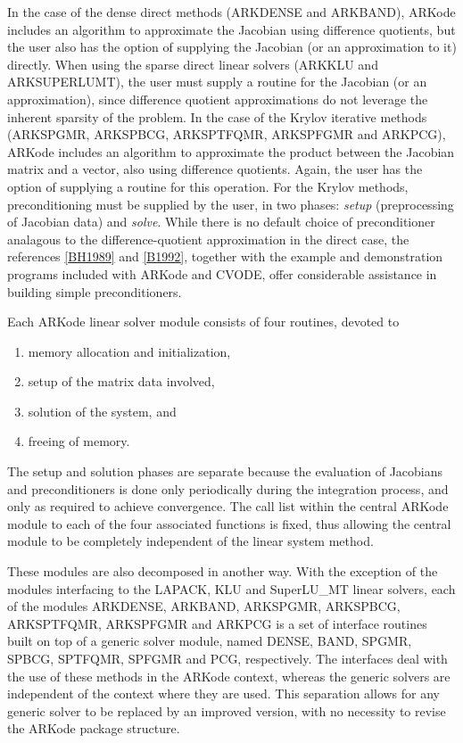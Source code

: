 \documentclass[letterpaper,10pt,english]{sphinxmanual}
\begin{document}
In the case of the dense direct methods (ARKDENSE and ARKBAND), ARKode
includes an algorithm to approximate the Jacobian using difference
quotients, but the user also has the option of supplying the Jacobian
(or an approximation to it) directly.  When using the sparse direct
linear solvers (ARKKLU and ARKSUPERLUMT), the user must supply a
routine for the Jacobian (or an approximation), since difference
quotient approximations do not leverage the inherent sparsity of the
problem.  In the case of the Krylov iterative methods (ARKSPGMR,
ARKSPBCG, ARKSPTFQMR, ARKSPFGMR and ARKPCG), ARKode includes an
algorithm to approximate the product between the Jacobian matrix and a
vector, also using difference quotients.  Again, the user has the
option of supplying a routine for this operation.  For the Krylov
methods, preconditioning must be supplied by the user, in two phases:
\emph{setup} (preprocessing of Jacobian data) and \emph{solve}.  While there is
no default choice of preconditioner analagous to the
difference-quotient approximation in the direct case, the references
{\hyperref[References:bh1989]{{[}BH1989{]}}} and {\hyperref[References:b1992]{{[}B1992{]}}}, together with the example and demonstration
programs included with ARKode and CVODE, offer considerable assistance
in building simple preconditioners.

Each ARKode linear solver module consists of four routines,
devoted to
\begin{enumerate}
\item {} 
memory allocation and initialization,

\item {} 
setup of the matrix data involved,

\item {} 
solution of the system, and

\item {} 
freeing of memory.

\end{enumerate}

The setup and solution phases are separate because the evaluation of
Jacobians and preconditioners is done only periodically during the
integration process, and only as required to achieve convergence.  The
call list within the central ARKode module to each of the four
associated functions is fixed, thus allowing the central module to be
completely independent of the linear system method.

These modules are also decomposed in another way.  With the exception
of the modules interfacing to the LAPACK, KLU and SuperLU\_MT linear
solvers, each of the modules ARKDENSE, ARKBAND, ARKSPGMR, ARKSPBCG,
ARKSPTFQMR, ARKSPFGMR and ARKPCG is a set of interface routines built
on top of a generic solver module, named DENSE, BAND,
SPGMR, SPBCG, SPTFQMR, SPFGMR and PCG, respectively.  The interfaces
deal with the use of these methods in the ARKode context, whereas
the generic solvers are independent of the context where they are
used.  This separation allows for any generic solver to be replaced by
an improved version, with no necessity to revise the ARKode
package structure.
\end{document}
